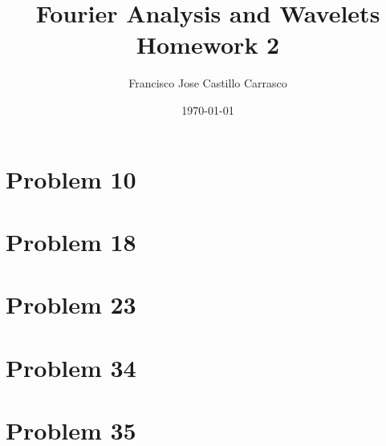 




\title{Fourier Analysis and Wavelets\\Homework 2}
\author{Francisco Jose Castillo Carrasco}
\date{\today}
\maketitle




\section*{Problem 10}

\newpage
\section*{Problem 18}

\newpage
\section*{Problem 23}


\section*{Problem 34}


\section*{Problem 35}




